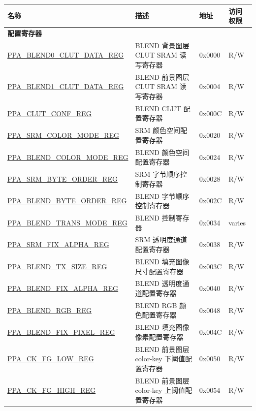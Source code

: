 \begin{longtable}{ | p{6cm} | p{7.2cm} | p{1.3cm} | p{1cm} | }
\hline\rowcolor{lightgray}
\textbf{名称} & \textbf{描述} &  \textbf{地址} & \textbf{访问权限} \\ \hline
\endhead
\multicolumn{4}{|l|}{\textbf{配置寄存器}} \\ \hline
\hyperref[regdesc:PPABLEND0CLUTDATAREG]{PPA\_BLEND0\_CLUT\_DATA\_REG} & BLEND 背景图层 CLUT SRAM 读写寄存器 & 0x0000 & R/W \\ \hline
\hyperref[regdesc:PPABLEND1CLUTDATAREG]{PPA\_BLEND1\_CLUT\_DATA\_REG} & BLEND 前景图层 CLUT SRAM 读写寄存器 & 0x0004 & R/W \\ \hline
\hyperref[regdesc:PPACLUTCONFREG]{PPA\_CLUT\_CONF\_REG} & BLEND CLUT 配置寄存器 & 0x000C & R/W \\ \hline
\hyperref[regdesc:PPASRMCOLORMODEREG]{PPA\_SRM\_COLOR\_MODE\_REG} & SRM 颜色空间配置寄存器 & 0x0020 & R/W \\ \hline
\hyperref[regdesc:PPABLENDCOLORMODEREG]{PPA\_BLEND\_COLOR\_MODE\_REG} & BLEND 颜色空间配置寄存器 & 0x0024 & R/W \\ \hline
\hyperref[regdesc:PPASRMBYTEORDERREG]{PPA\_SRM\_BYTE\_ORDER\_REG} & SRM 字节顺序控制寄存器 & 0x0028 & R/W \\ \hline
\hyperref[regdesc:PPABLENDBYTEORDERREG]{PPA\_BLEND\_BYTE\_ORDER\_REG} & BLEND 字节顺序控制寄存器 & 0x002C & R/W \\ \hline
\hyperref[regdesc:PPABLENDTRANSMODEREG]{PPA\_BLEND\_TRANS\_MODE\_REG} & BLEND 控制寄存器 & 0x0034 & varies \\ \hline
\hyperref[regdesc:PPASRMFIXALPHAREG]{PPA\_SRM\_FIX\_ALPHA\_REG} & SRM 透明度通道配置寄存器 & 0x0038 & R/W \\ \hline
\hyperref[regdesc:PPABLENDTXSIZEREG]{PPA\_BLEND\_TX\_SIZE\_REG} & BLEND 填充图像尺寸配置寄存器 & 0x003C & R/W \\ \hline
\hyperref[regdesc:PPABLENDFIXALPHAREG]{PPA\_BLEND\_FIX\_ALPHA\_REG} & BLEND 透明度通道配置寄存器 & 0x0040 & R/W \\ \hline
\hyperref[regdesc:PPABLENDRGBREG]{PPA\_BLEND\_RGB\_REG} & BLEND RGB 颜色配置寄存器 & 0x0048 & R/W \\ \hline
\hyperref[regdesc:PPABLENDFIXPIXELREG]{PPA\_BLEND\_FIX\_PIXEL\_REG} & BLEND 填充图像像素配置寄存器 & 0x004C & R/W \\ \hline
\hyperref[regdesc:PPACKFGLOWREG]{PPA\_CK\_FG\_LOW\_REG} & BLEND 前景图层 color-key 下阈值配置寄存器 & 0x0050 & R/W \\ \hline
\hyperref[regdesc:PPACKFGHIGHREG]{PPA\_CK\_FG\_HIGH\_REG} & BLEND 前景图层 color-key 上阈值配置寄存器 & 0x0054 & R/W \\ \hline

\end{longtable}
